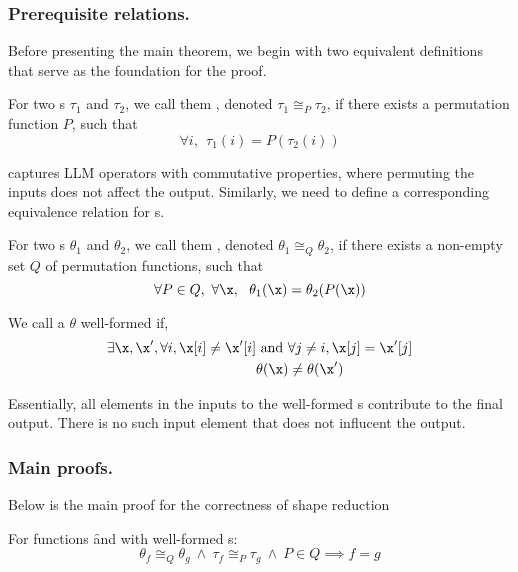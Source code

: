 \subsubsection{Prerequisite relations.}
Before presenting the main theorem, we begin with two equivalent definitions
that serve as the foundation for the proof.

\begin{definition}[\CF{\depeq}]
For two \depmap{}s $\tau_1$ and $\tau_2$,
we call them \depeq, denoted $\tau_1 \cong_P \tau_2$,
if there exists a permutation function $P$,
such that
\[
\forall i, \ \ \tau_1(i) = P(\tau_2(i))
\]
\end{definition}

\CF{\depeq} captures LLM operators with commutative
properties, where permuting the inputs does not affect the output. Similarly,
we need to define a corresponding equivalence relation for \kfunc{}s.


\begin{definition}[\CF{\kerneq}]
For two \kfunc{}s $\theta_1$ and $\theta_2$,
we call them , denoted $\theta_1 \cong_Q \theta_2$,
if there exists a non-empty set $Q$ of permutation functions,
such that
\[
\forall P\in Q,\ \forall \x, \ \ \theta_1(\x) = \theta_2(P(\x))
\]
\end{definition}


\begin{definition}
    We call a \kfunc $\theta$ well-formed if,
    \begin{align*}
        \exists \x,\x', \forall i, \x[i] \neq \x'[i] &\text{ and } \forall j\neq i, \x[j]=\x'[j]\\
        & \theta(\x) \neq \theta(\x')
    \end{align*}
    \label{def:wellform}
\end{definition}

Essentially, all elements in the inputs to the well-formed \kfunc{}s
contribute to the final output.
There is no such input element that does not influcent the output.

\subsubsection{Main proofs.}
Below is the main proof for the correctness of shape reduction

\begin{lemma}
For \simd{} functions \f and \g with well-formed \kfunc{}s:
\[
\theta_f \cong_Q \theta_g\ \land\
\tau_f \cong_P \tau_g \ \land \
P\in Q \implies f=g
\]
\label{lemma:main}
\end{lemma}

